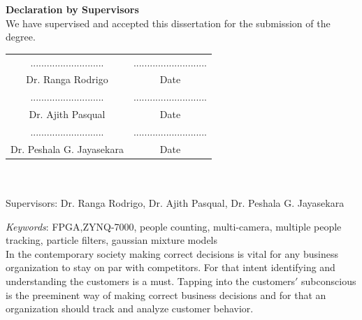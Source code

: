 \documentclass[12pt,a4paper]{report}
\begin{document}
\newpage
\noindent \textbf{Declaration by Supervisors}\\[0.5cm]
We have supervised and accepted this dissertation for the submission of the degree.\\[1cm]
\begin{table}[h]
\begin{tabular}{cc}
........................... & \hspace{5cm}........................... \\
Dr. Ranga Rodrigo           & \hspace{5cm}Date                        \\[1cm]
........................... & \hspace{5cm}........................... \\
Dr. Ajith Pasqual           & \hspace{5cm}Date                        \\[1cm]
........................... & \hspace{5cm}........................... \\
Dr. Peshala G. Jayasekara   & \hspace{5cm}Date                       
\end{tabular}
\end{table}
\newpage
{}
\begin{center}
\fontsize{18pt}{18}\\[0.5cm]
\fontsize{12pt}{12}\selectfont{Group Members: R.V.C.N Abeyrathne, D.L Dampahalage, H.A.S.P Gunasekara, W.M.D.K Weerakoon}\\[0.25cm]
Supervisors: Dr. Ranga Rodrigo, Dr. Ajith Pasqual, Dr. Peshala G. Jayasekara
\end{center}
\textit{Keywords}: FPGA,ZYNQ-7000, people counting, multi-camera, multiple people tracking, particle filters, gaussian mixture models\\[0.5cm]
In the contemporary society making correct decisions is vital for any business organization to stay on par with competitors. For that intent identifying and understanding the
customers is a must. Tapping into the customers$'$ subconscious is the preeminent way of making correct business decisions and for that an organization should track and analyze customer behavior.\\
\end{document}
